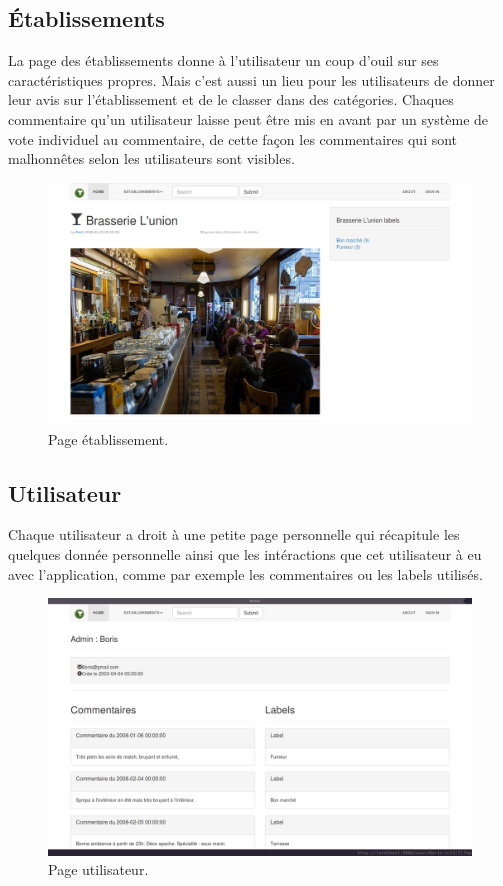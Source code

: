 \documentclass[a4paper,10pt]{article}
\begin{document}
\subsection{Établissements}
La page des établissements donne à l'utilisateur un coup d'ouil sur ses
caractéristiques propres. Mais c'est aussi un lieu pour les utilisateurs de
donner leur avis sur l'établissement et de le classer dans des catégories.
Chaques commentaire qu'un utilisateur laisse peut être mis en avant par un
système de vote individuel au commentaire, de cette façon les commentaires qui
sont malhonnêtes selon les utilisateurs sont visibles.

\begin{figure}[h]
  \centering
  \includegraphics[scale=0.2]{./images/establishment_1.png}
  \caption{Page établissement.}
\end{figure}

\subsection{Utilisateur}
Chaque utilisateur a droit à une petite page personnelle qui récapitule les
quelques donnée personnelle ainsi que les intéractions que cet utilisateur à eu
avec l'application, comme par exemple les commentaires ou les labels utilisés.

\begin{figure}[h]
  \centering
  \includegraphics[scale=0.2]{./images/user.png}
  \caption{Page utilisateur.}
\end{figure}
\end{document}
